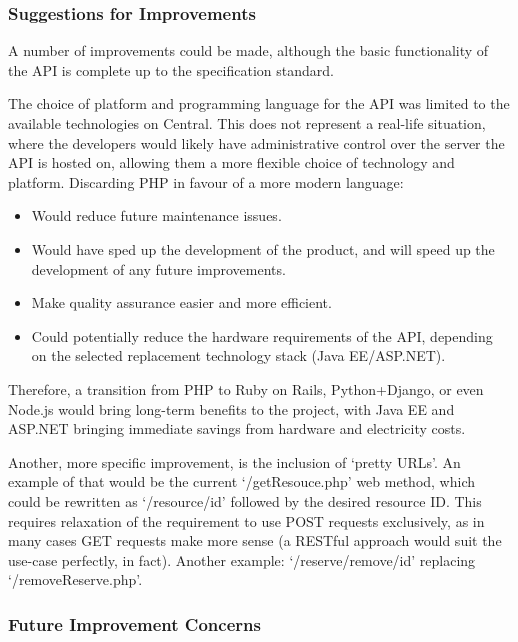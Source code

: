    \subsubsection{Suggestions for Improvements}

        A number of improvements could be made, although the basic functionality of the API is complete up to the specification standard.
    
        The choice of platform and programming language for the API was limited to the available technologies on Central. This does not represent a real-life situation, where the developers would likely have administrative control over the server the API is hosted on, allowing them a more flexible choice of technology and platform. Discarding PHP in favour of a more modern
        language: 
        \begin{itemize}
            \item Would reduce future maintenance issues.
            \item Would have sped up the development of the product, and will speed up the development of any future improvements.
            \item Make quality assurance easier and more efficient.
            \item Could potentially reduce the hardware requirements of the API, depending on the selected replacement technology stack (Java EE/ASP.NET).
        \end{itemize}

        Therefore, a transition from PHP to Ruby on Rails, Python+Django, or even Node.js would bring long-term benefits to the project, with Java EE and ASP.NET bringing immediate savings from hardware and electricity costs.
    
        Another, more specific improvement, is the inclusion of `pretty URLs'. An example of that would be the current `/getResouce.php' web method, which could be rewritten as `/resource/{id}' followed by the desired resource ID. This requires relaxation of the requirement to use POST requests exclusively, as in many cases GET requests make more sense (a RESTful approach would suit the use-case perfectly, in fact). Another example: `/reserve/remove/{id}' replacing `/removeReserve.php'.

    \subsubsection{Future Improvement Concerns}

